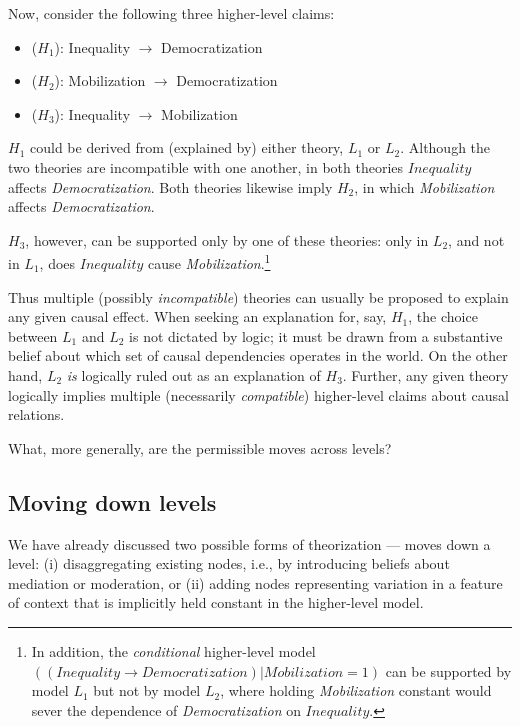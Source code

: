 \documentclass[
  12pt,
]{book}
\providecommand{\tightlist}{%
  \setlength{\itemsep}{0pt}\setlength{\parskip}{0pt}}
\begin{document}
Now, consider the following three higher-level claims:

\begin{itemize}
\tightlist
\item
  (\(H_1\)): Inequality \(\rightarrow\) Democratization
\item
  (\(H_2\)): Mobilization \(\rightarrow\) Democratization
\item
  (\(H_3\)): Inequality \(\rightarrow\) Mobilization
\end{itemize}

\(H_1\) could be derived from (explained by) either theory, \(L_1\) or \(L_2\). Although the two theories are incompatible with one another, in both theories \(Inequality\) affects \emph{Democratization}. Both theories likewise imply \(H_2\), in which \emph{Mobilization} affects \emph{Democratization}.

\(H_3\), however, can be supported only by one of these theories: only in \(L_2\), and not in \(L_1\), does \(Inequality\) cause \emph{Mobilization}.\footnote{In addition, the \emph{conditional} higher-level model \(((Inequality \rightarrow Democratization)|Mobilization=1)\) can be supported by model \(L_1\) but not by model \(L_2\), where holding \emph{Mobilization} constant would sever the dependence of \emph{Democratization} on \(Inequality\).}

Thus multiple (possibly \emph{incompatible}) theories can usually be proposed to explain any given causal effect. When seeking an explanation for, say, \(H_1\), the choice between \(L_1\) and \(L_2\) is not dictated by logic; it must be drawn from a substantive belief about which set of causal dependencies operates in the world. On the other hand, \(L_2\) \emph{is} logically ruled out as an explanation of \(H_3\). Further, any given theory logically implies multiple (necessarily \emph{compatible}) higher-level claims about causal relations.

What, more generally, are the permissible moves across levels?

\hypertarget{moving-down-levels}{%
\subsection{Moving down levels}\label{moving-down-levels}}

We have already discussed two possible forms of theorization --- moves down a level: (i) disaggregating existing nodes, i.e., by introducing beliefs about mediation or moderation, or (ii) adding nodes representing variation in a feature of context that is implicitly held constant in the higher-level model.
\end{document}
